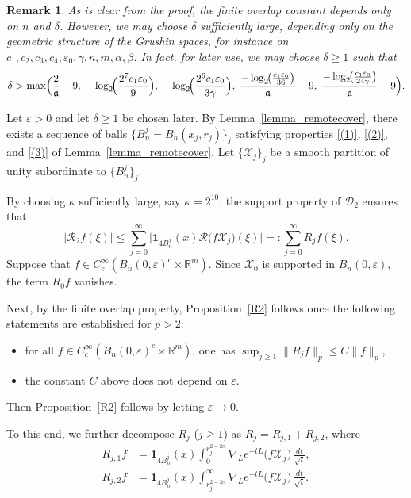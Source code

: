 \documentclass[12pt]{amsart}
\newtheorem{remark}[theorem]{Remark}
\begin{document}
\begin{remark}\label{remark_delta}
As is clear from the proof, the finite overlap constant depends only on $n$ and $\delta$. However, we may choose $\delta$ sufficiently large, depending only on the geometric structure of the Grushin spaces, for instance on $c_1,c_2,c_3,c_4,\varepsilon_0,\gamma,n,m,\alpha,\beta$. In fact, for later use, we may choose $\delta \ge 1$ such that
\begin{equation}\label{delta}
    \delta > \max \Bigl( \frac{2}{\mathfrak a} - 9,\; - \log_2\!\Bigl({\frac{2^7 c_1 \varepsilon_0}{9}}\Bigr),\;    - \log_2\!\Bigl({\frac{2^6 c_1 \varepsilon_0}{3\gamma}}\Bigr),\; \frac{-\log_2\!\bigl({\frac{c_1 \varepsilon_0}{36}}\bigr)}{\mathfrak a}-9,\;    \frac{-\log_2\!\bigl({\frac{c_1 \varepsilon_0}{24 \gamma}}\bigr)}{\mathfrak a}-9    \Bigr).
\end{equation}
\end{remark}

Let $\varepsilon>0$ and let $\delta \ge 1$ be chosen later. By Lemma~\ref{lemma_remotecover}, there exists a sequence of balls $\{B_n^j=B_n(x_j,r_j)\}_j$ satisfying properties \eqref{(1)}, \eqref{(2)}, and \eqref{(3)} of Lemma~\ref{lemma_remotecover}. Let $\{\mathcal{X}_j\}_j$ be a smooth partition of unity subordinate to $\{B_n^j\}_j$.

By choosing $\kappa$ sufficiently large, say $\kappa = 2^{10}$, the support property of $\mathcal{D}_2$ ensures that
\begin{equation*}
    |\mathcal{R}_2f(\xi)| \le \sum_{j=0}^\infty \bigl| \mathbf{1}_{4B_n^j}(x) \mathcal{R} \bigl( f \mathcal{X}_j \bigr)(\xi) \bigr| =: \sum_{j=0}^\infty R_j f(\xi).
\end{equation*}
Suppose that $f\in C_c^\infty(B_n(0,\varepsilon)^c \times \mathbb{R}^m)$. Since $\mathcal{X}_0$ is supported in $B_n(0,\varepsilon)$, the term $R_0f$ vanishes.

Next, by the finite overlap property, Proposition~\ref{R2} follows once the following statements are established for $p>2$:
\begin{itemize}
    \item for all $f\in C_c^\infty(B_n(0,\varepsilon)^c \times \mathbb{R}^m)$, one has $\sup_{j\ge 1} \| R_jf\|_{p}\le C\|f\|_p$,
    \item the constant $C$ above does not depend on $\varepsilon$.
\end{itemize}
Then Proposition~\ref{R2} follows by letting $\varepsilon \to 0$.

To this end, we further decompose $R_j$ ($j\ge 1$) as $R_j = R_{j,1}+R_{j,2}$, where
\begin{align}
    R_{j,1}f &= \mathbf{1}_{4B_n^j}(x) \int_0^{r_j^{2-2\alpha}} \nabla_L e^{-tL}\bigl(f \mathcal{X}_j\bigr) \, \frac{dt}{\sqrt{t}},\\[4pt]
    R_{j,2}f &= \mathbf{1}_{4B_n^j}(x) \int_{r_j^{2-2\alpha}}^\infty \nabla_L e^{-tL}\bigl(f \mathcal{X}_j\bigr) \, \frac{dt}{\sqrt{t}}.
\end{align}
\end{document}
